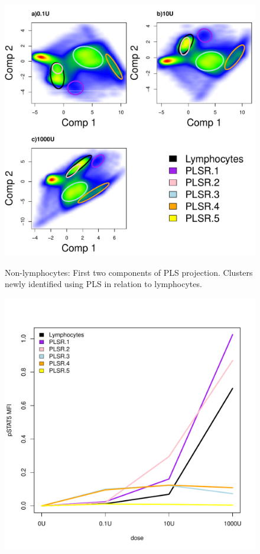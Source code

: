 \begin{figure}
  \centering
\begin{minipage}{.6\textwidth}
  \includegraphics[width=\linewidth]{figures/plsr-nonlymphocytes.pdf}
\end{minipage}
\begin{minipage}{.3\textwidth}
{ Non-lymphocytes: First two components of \gls{PLS} projection.  Clusters newly identified using \gls{PLS} in relation to lymphocytes. }
{ } 
\end{minipage}
%
\begin{minipage}{.6\textwidth}
  \includegraphics[width=\linewidth]{figures/plsr-nonlymphocytes-dose-response.pdf}

\end{minipage}
\end{figure}

